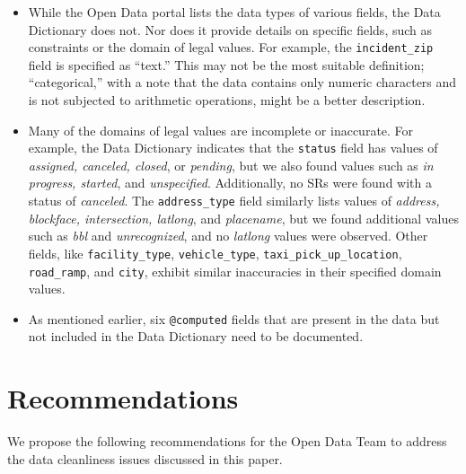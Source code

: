 \documentclass[linenumber]{jdsart}
\begin{document}
\begin{itemize}
    \item While the Open Data portal lists the data types of various 
    fields, the Data Dictionary does not. Nor does it provide details 
    on specific fields, such as constraints or the domain of legal 
    values. For example, the \texttt{incident\_zip} field is specified 
    as ``text.'' This may not be the most suitable definition; 
    ``categorical,'' with a note that the data contains only numeric 
    characters and is not subjected to arithmetic operations, might 
    be a better description.
    
    \item Many of the domains of legal values are incomplete or 
    inaccurate. For example, the Data Dictionary indicates that the 
    \texttt{status} field has values of \textit{assigned, canceled, 
    closed}, or \textit{pending}, but we also found values such as 
    \textit{in progress, started}, and \textit{unspecified}. 
    Additionally, no SRs were found with a status of 
    \textit{canceled}. The \texttt{address\_type} field similarly 
    lists values of \textit{address, blockface, intersection, latlong}, 
    and \textit{placename}, but we found additional values such as 
    \textit{bbl} and \textit{unrecognized}, and no \textit{latlong} 
    values were observed. Other fields, like \texttt{facility\_type}, 
    \texttt{vehicle\_type}, \texttt{taxi\_pick\_up\_location}, 
    \texttt{road\_ramp}, and \texttt{city}, exhibit similar inaccuracies 
    in their specified domain values.
    
  \item As mentioned earlier, six \texttt{@computed} fields that are
    present in the data but not included in the Data Dictionary need
    to be documented.
\end{itemize}


\section{Recommendations} 
\label{sec:recommendations}
We propose the following recommendations for the Open Data Team to 
address the data cleanliness issues discussed in this paper.
\end{document}
